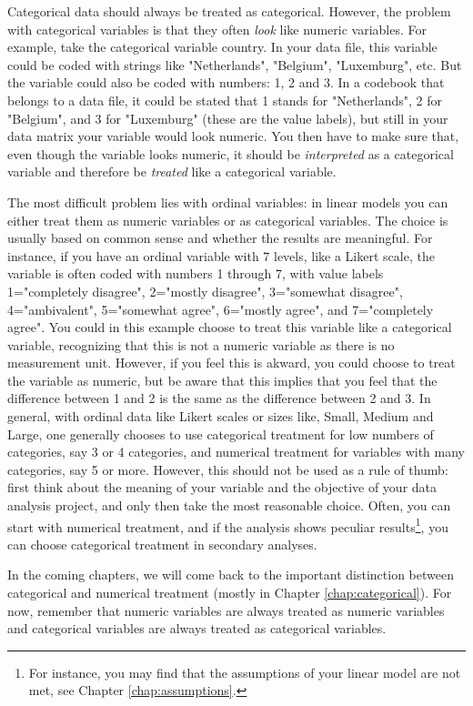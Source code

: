 \documentclass[]{book}\usepackage[]{graphicx}\usepackage[]{color}
\begin{document}
Categorical data should always be treated as categorical. However, the problem with categorical variables is that they often \textit{look} like numeric variables. For example, take the categorical variable country. In your data file, this variable could be coded with strings like "Netherlands", "Belgium", "Luxemburg", etc. But the variable could also be coded with numbers: 1, 2 and 3. In a codebook that belongs to a data file, it could be stated that 1 stands for "Netherlands", 2 for "Belgium", and 3 for "Luxemburg" (these are the value labels), but still in your data matrix your variable would look numeric. You then have to make sure that, even though the variable looks numeric, it should be \textit{interpreted} as a categorical variable and therefore be \textit{treated} like a categorical variable.

The most difficult problem lies with ordinal variables: in linear models you can either treat them as numeric variables or as categorical variables. The choice is usually based on common sense and whether the results are meaningful. For instance, if you have an ordinal variable with 7 levels, like a Likert scale, the variable is often coded with numbers 1 through 7, with value labels 1="completely disagree", 2="mostly disagree", 3="somewhat disagree", 4="ambivalent", 5="somewhat agree", 6="mostly agree", and 7="completely agree". You could in this example choose to treat this variable like a categorical variable, recognizing that this is not a numeric variable as there is no measurement unit. However, if you feel this is akward, you could choose to treat the variable as numeric, but be aware that this implies that you feel that the difference between 1 and 2 is the same as the difference between 2 and 3. In general, with ordinal data like Likert scales or sizes like, Small, Medium and Large, one generally chooses to use categorical treatment for low numbers of categories, say 3 or 4 categories, and numerical treatment for variables with many categories, say 5 or more. However, this should not be used as a rule of thumb: first think about the meaning of your variable and the objective of your data analysis project, and only then take the most reasonable choice. Often, you can start with numerical treatment, and if the analysis shows peculiar results\footnote{For instance, you may find that the assumptions of your linear model are not met, see Chapter \ref{chap:assumptions}.}, you can choose categorical treatment in secondary analyses.

In the coming chapters, we will come back to the important distinction between categorical and numerical treatment (mostly in Chapter \ref{chap:categorical}). For now, remember that numeric variables are always treated as numeric variables and categorical variables are always treated as categorical variables.
\end{document}
